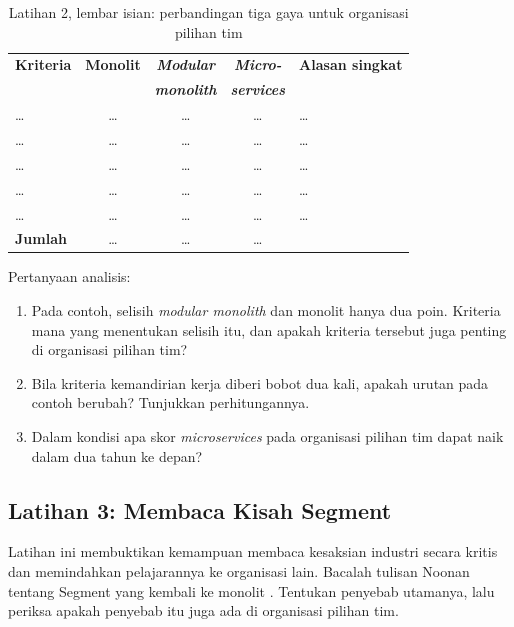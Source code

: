 \begin{table}[!htb]
  \centering
  \caption{Latihan 2, lembar isian: perbandingan tiga gaya untuk organisasi pilihan tim}
  \label{tab:ch07-lat2-hasil}
  \footnotesize
  \begin{tabularx}{\textwidth}{>{\raggedright\arraybackslash}p{2.8cm} c c c >{\raggedright\arraybackslash}X}
    \hline
    \textbf{Kriteria} & \textbf{Monolit} & \textbf{\textit{Modular}} & \textbf{\textit{Micro-}} &
      \textbf{Alasan singkat} \\
    & & \textbf{\textit{monolith}} & \textbf{\textit{services}} & \\ \hline
    \dots & \dots & \dots & \dots & \dots \\ \hline
    \dots & \dots & \dots & \dots & \dots \\ \hline
    \dots & \dots & \dots & \dots & \dots \\ \hline
    \dots & \dots & \dots & \dots & \dots \\ \hline
    \dots & \dots & \dots & \dots & \dots \\ \hline
    \textbf{Jumlah} & \dots & \dots & \dots & \\ \hline
  \end{tabularx}
\end{table}

Pertanyaan analisis:
\begin{enumerate}
  \item Pada contoh, selisih \textit{modular monolith} dan monolit hanya dua poin. Kriteria mana
        yang menentukan selisih itu, dan apakah kriteria tersebut juga penting di organisasi
        pilihan tim?
  \item Bila kriteria kemandirian kerja diberi bobot dua kali, apakah urutan pada contoh berubah?
        Tunjukkan perhitungannya.
  \item Dalam kondisi apa skor \textit{microservices} pada organisasi pilihan tim dapat naik dalam
        dua tahun ke depan?
\end{enumerate}

\subsection*{Latihan 3: Membaca Kisah Segment}

Latihan ini membuktikan kemampuan membaca kesaksian industri secara kritis dan memindahkan
pelajarannya ke organisasi lain. Bacalah tulisan Noonan tentang Segment yang kembali ke monolit
\cite{noonan2018}. Tentukan penyebab utamanya, lalu periksa apakah penyebab itu juga ada di
organisasi pilihan tim.

